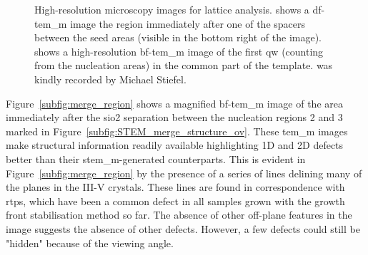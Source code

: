 \begin{figure}
    \centering
    \caption[High-resolution microscopy images for the lattice analysis of the merge structures.]{High-resolution microscopy images for lattice analysis.  shows a \acs{df}-\acs{tem_m} image the region immediately after one of the spacers between the seed areas (visible in the bottom right of the image).  shows a high-resolution \acs{bf}-\acs{tem_m} image of the first \acl{qw} (counting from the nucleation areas) in the common part of the template.  was kindly recorded by Michael Stiefel.}
    \label{fig:merge_high-res}
\end{figure}

Figure~\ref{subfig:merge_region} shows a magnified \acs{bf}-\acs{tem_m} image of the area immediately after the \acs{sio2} separation between the nucleation regions 2 and 3 marked in Figure~\ref{subfig:STEM_merge_structure_ov}. These \acs{tem_m} images make structural information readily available highlighting 1D and 2D defects better than their \acs{stem_m}-generated counterparts. This is evident in Figure~\ref{subfig:merge_region} by the presence of a series of lines delining many of the  planes in the III-V crystals. These lines are found in correspondence with \acs{rtp}s, which have been a common defect in all samples grown with the  growth front stabilisation method so far. The absence of other off-plane features in the image suggests the absence of other defects. However, a few defects could still be "hidden" because of the viewing angle.

